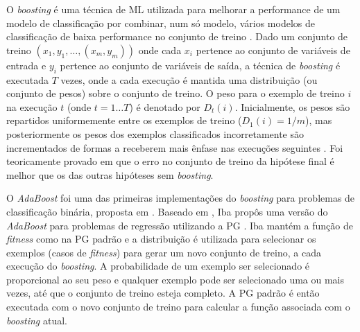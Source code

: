 O \emph{boosting} é uma técnica de \ac{ML} utilizada para melhorar a performance de um modelo de classificação por combinar, num só
modelo, vários modelos de classificação de baixa performance no conjunto de treino \citep{schapire1990strength}. Dado um conjunto de treino
$(x_1,y_1,\ldots,(x_m,y_m))$ onde cada $x_i$ pertence ao conjunto de variáveis de entrada e $y_i$ pertence ao conjunto de variáveis
de saída, a técnica de \emph{boosting} é executada $T$ vezes, onde a cada execução é mantida uma distribuição (ou conjunto de
pesos) sobre o conjunto de treino. O peso para o exemplo de treino $i$ na execução $t$ (onde $t = 1 \ldots T$) é denotado por 
$D_t(i)$. Inicialmente, os pesos são repartidos uniformemente entre os exemplos de treino ($D_1(i) = 1/m$), mas posteriormente
os pesos dos exemplos classificados incorretamente são incrementados de formas a receberem mais ênfase nas execuções seguintes
\citep{paris2002applying}. Foi teoricamente provado em \citep{valiant1984theory} que o erro no conjunto de treino da hipótese
final é melhor que os das outras hipóteses sem \emph{boosting}.


O \emph{AdaBoost} foi uma das primeiras implementações do \emph{boosting} para problemas de classificação binária, proposta em 
\citep{freund1996experiments}. Baseado em \citep{drucker1997improving}, Iba propôs uma versão do \emph{AdaBoost} para problemas de 
regressão utilizando a \ac{PG} \citep{iba1999bagging}. Iba mantém a função de \emph{fitness} como na \ac{PG} padrão e a distribuição é 
utilizada para selecionar os exemplos (casos de \emph{fitness}) para gerar um novo conjunto de treino, a cada execução do \emph{boosting}. 
A probabilidade de um exemplo ser selecionado é proporcional ao seu peso e qualquer exemplo pode ser selecionado uma ou mais vezes, 
até que o conjunto de treino esteja completo. A \ac{PG} padrão é então executada com o novo conjunto de treino para calcular 
a função associada com o \emph{boosting} atual.
 
